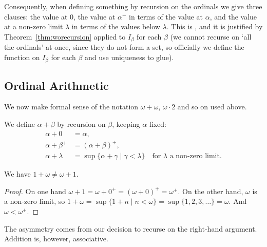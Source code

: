 Consequently, when defining something by recursion on the ordinals we give three clauses: the value at $0$, the value at $\alpha^+$ in terms of the value at $\alpha$, and the value at a non-zero limit $\lambda$ in terms of the values below $\lambda$. This is , and it is justified by Theorem~\ref{thm:worecursion} applied to $I_\beta$ for each $\beta$ (we cannot recurse on `all the ordinals' at once, since they do not form a set, so officially we define the function on $I_\beta$ for each $\beta$ and use uniqueness to glue).

\subsection{Ordinal Arithmetic}\label{sec:ordarith}

We now make formal sense of the notation $\omega + \omega$, $\omega \cdot 2$ and so on used above.

\begin{definition}
We define $\alpha + \beta$ by recursion on $\beta$, keeping $\alpha$ fixed:
\begin{align*}
  \alpha + 0 &= \alpha,\\
  \alpha + \beta^+ &= (\alpha + \beta)^+,\\
  \alpha + \lambda &= \sup\{\alpha + \gamma \mid \gamma < \lambda\} \quad \text{for } \lambda \text{ a non-zero limit.}
\end{align*}
\end{definition}

\begin{proposition}
  We have $1 + \omega \neq \omega + 1$.
\end{proposition}
\begin{proof}
  On one hand $\omega + 1 = \omega + 0^+ = (\omega + 0)^+ = \omega^+$. On the other hand, $\omega$ is a non-zero limit, so $1 + \omega = \sup\{1 + n \mid n < \omega\} = \sup\{1, 2, 3, \dots\} = \omega$. And $\omega < \omega^+$.
\end{proof}

The asymmetry comes from our decision to recurse on the right-hand argument. Addition is, however, associative.

